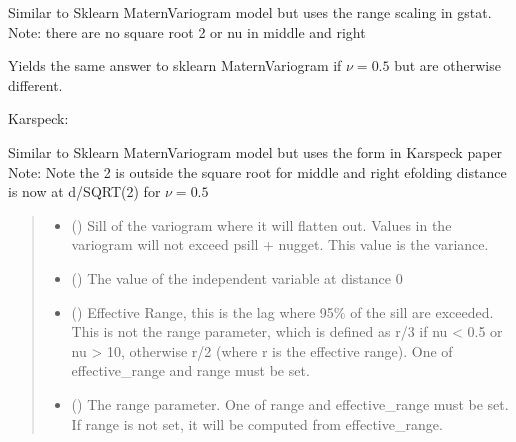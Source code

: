 \documentclass[letterpaper,10pt,english]{sphinxmanual}
\begin{document}
\begin{fulllineitems}
\sphinxAtStartPar
Similar to Sklearn MaternVariogram model but uses the range scaling in
gstat.
Note: there are no square root 2 or nu in middle and right

\sphinxAtStartPar
Yields the same answer to sklearn MaternVariogram if \(\nu=0.5\)
but are otherwise different.

\sphinxAtStartPar
Karspeck:

\sphinxAtStartPar
Similar to Sklearn MaternVariogram model but uses the form in Karspeck paper
Note: Note the 2 is outside the square root for middle and right
e\sphinxhyphen{}folding distance is now at d/SQRT(2) for \(\nu=0.5\)
\begin{quote}\begin{description}
\begin{itemize}
\item {}
\sphinxAtStartPar
{} (\sphinxstyleliteralemphasis{\sphinxupquote{ | }}) \textendash{} Sill of the variogram where it will flatten out. Values in the variogram
will not exceed psill + nugget. This value is the variance.

\item {}
\sphinxAtStartPar
{} (\sphinxstyleliteralemphasis{\sphinxupquote{ | }}) \textendash{} The value of the independent variable at distance 0

\item {}
\sphinxAtStartPar
{} (\sphinxstyleliteralemphasis{\sphinxupquote{ | }}\sphinxstyleliteralemphasis{\sphinxupquote{ | }}) \textendash{} Effective Range, this is the lag where 95\% of the sill are exceeded.
This is not the range parameter, which is defined as r/3 if nu \textless{} 0.5 or
nu \textgreater{} 10, otherwise r/2 (where r is the effective range). One of
effective\_range and range must be set.

\item {}
\sphinxAtStartPar
{} (\sphinxstyleliteralemphasis{\sphinxupquote{ | }}\sphinxstyleliteralemphasis{\sphinxupquote{ | }}) \textendash{} The range parameter. One of range and effective\_range must be set. If
range is not set, it will be computed from effective\_range.


\end{itemize}
\end{description}
\end{quote}
\end{fulllineitems}
\end{document}
